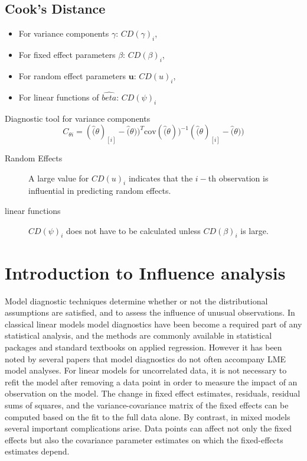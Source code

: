 \documentclass[12pt, a4paper]{report}
\theoremstyle{plain}
\theoremstyle{definition}
\theoremstyle{remark}
\begin{document}
	
	
	

	
	
	
	
	\subsection{Cook's Distance}
	\begin{itemize}
		\item For variance components $\gamma$: $CD(\gamma)_i$,
		\item For fixed effect parameters $\beta$: $CD(\beta)_i$,
		\item For random effect parameters $\boldsymbol{u}$: $CD(u)_i$,
		\item For linear functions of $\hat{beta}$: $CD(\psi)_i$
	\end{itemize}
	Diagnostic tool for variance components
	\[ C_{\theta i} =(\hat(\theta)_{[i]} - \hat(\theta))^{T}\mbox{cov}( \hat(\theta))^{-1}(\hat(\theta)_{[i]} - \hat(\theta))\]

\begin{description}
\item[Random Effects]	
		A large value for $CD(u)_i$ indicates that the $i-$th observation is influential in predicting random effects.
	\item[linear functions]
	$CD(\psi)_i$ does not have to be calculated unless $CD(\beta)_i$ is large.
\end{description}

	

	
	\section{Introduction to Influence analysis} %
	Model diagnostic techniques determine whether or not the distributional assumptions are satisfied, and to assess the influence of unusual observations. In classical linear models model diagnostics have been become a required part of any statistical analysis, and the methods are commonly available in statistical packages and standard textbooks on applied regression. However it has been noted by several papers that model diagnostics do not often accompany LME model analyses.
	For linear models for uncorrelated data, it is not necessary to refit the model after removing a data point in order to measure the impact of an observation on the model. The change in fixed effect estimates, residuals, residual sums of squares, and the variance-covariance matrix of the fixed effects can be computed based on the fit to the full data alone. By contrast, in mixed models several important complications arise. Data points can affect not only the fixed effects but also the covariance parameter estimates on which the fixed-effects estimates depend. 
	
\end{document}
